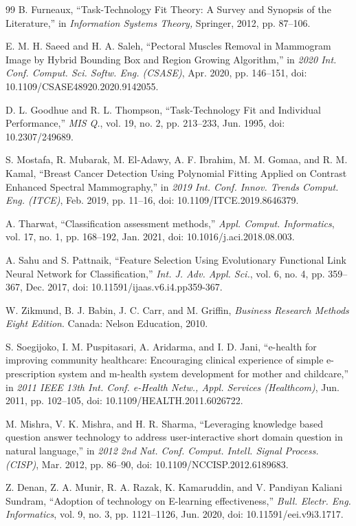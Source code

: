\documentclass{iaesarticle}
\begin{document}
\begin{thebibliography} {99}
 B. Furneaux, “Task-Technology Fit Theory: A Survey and Synopsis of the Literature,” in \textsl{Information Systems Theory,} Springer, 2012, pp. 87–106.

 E. M. H. Saeed and H. A. Saleh, “Pectoral Muscles Removal in Mammogram Image by Hybrid Bounding Box and Region Growing Algorithm,” in \textsl{2020 Int. Conf.  Comput. Sci. Softw. Eng. (CSASE)}, Apr. 2020, pp. 146–151, doi: 10.1109/CSASE48920.2020.9142055.

 D. L. Goodhue and R. L. Thompson, “Task-Technology Fit and Individual Performance,” \textsl{MIS Q.}, vol. 19, no. 2, pp. 213–233, Jun. 1995, doi: 10.2307/249689.

 S. Mostafa, R. Mubarak, M. El-Adawy, A. F. Ibrahim, M. M. Gomaa, and R. M. Kamal, “Breast Cancer Detection Using Polynomial Fitting Applied on Contrast Enhanced Spectral Mammography,” in \textsl{2019 Int. Conf. Innov. Trends Comput. Eng. (ITCE)}, Feb. 2019, pp. 11–16, doi: 10.1109/ITCE.2019.8646379.

 A. Tharwat, “Classification assessment methods,” \textsl{Appl. Comput. Informatics}, vol. 17, no. 1, pp. 168–192, Jan. 2021, doi: 10.1016/j.aci.2018.08.003.

 A. Sahu and S. Pattnaik, “Feature Selection Using Evolutionary Functional Link Neural Network for Classification,” \textsl{Int. J. Adv. Appl. Sci.}, vol. 6, no. 4, pp. 359–367, Dec. 2017, doi: 10.11591/ijaas.v6.i4.pp359-367.

 W. Zikmund, B. J. Babin, J. C. Carr, and M. Griffin, \textsl{Business Research Methods Eight Edition}. Canada: Nelson Education, 2010.

 S. Soegijoko, I. M. Puspitasari, A. Aridarma, and I. D. Jani, “e-health for improving community healthcare: Encouraging clinical experience of simple e-prescription system and m-health system development for mother and childcare,” in \textsl{2011 IEEE 13th Int. Conf. e-Health Netw., Appl. Services (Healthcom)}, Jun. 2011, pp. 102–105, doi: 10.1109/HEALTH.2011.6026722.

 M. Mishra, V. K. Mishra, and H. R. Sharma, “Leveraging knowledge based question answer technology to address user-interactive short domain question in natural language,” in \textsl{2012 2nd Nat. Conf. Comput. Intell. Signal Process. (CISP)}, Mar. 2012, pp. 86–90, doi: 10.1109/NCCISP.2012.6189683.

 Z. Denan, Z. A. Munir, R. A. Razak, K. Kamaruddin, and V. Pandiyan Kaliani Sundram, “Adoption of technology on E-learning effectiveness,” \textsl{Bull. Electr. Eng. Informatics}, vol. 9, no. 3, pp. 1121–1126, Jun. 2020, doi: 10.11591/eei.v9i3.1717.

 \end{thebibliography}
\end{document}

